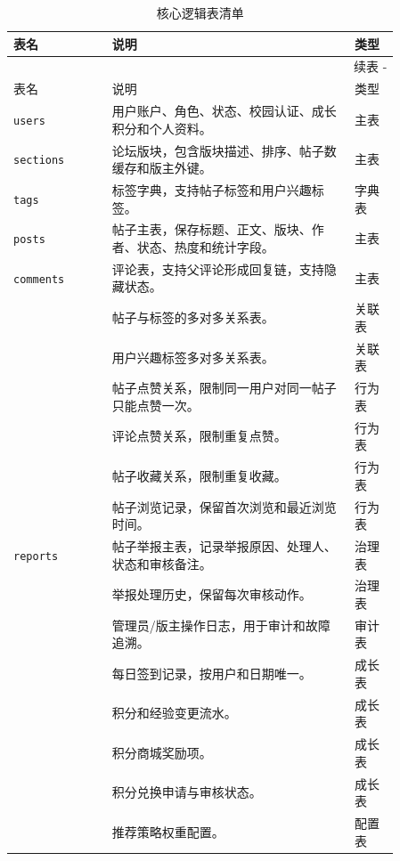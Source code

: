 \documentclass[UTF8,zihao=-4,a4paper]{ctexart}
\renewcommand{\thetable}{\thesection-\arabic{table}}
\begin{document}
\begin{longtable}{L{0.22\linewidth}L{0.54\linewidth}L{0.10\linewidth}}
\caption{核心逻辑表清单}\\
\toprule
表名 & 说明 & 类型 \\
\midrule
\endfirsthead
\multicolumn{3}{r}{续表 \thetable}\\
\toprule
表名 & 说明 & 类型 \\
\midrule
\endhead
\bottomrule
\endfoot
\texttt{users} & 用户账户、角色、状态、校园认证、成长积分和个人资料。 & 主表\\
\texttt{sections} & 论坛版块，包含版块描述、排序、帖子数缓存和版主外键。 & 主表\\
\texttt{tags} & 标签字典，支持帖子标签和用户兴趣标签。 & 字典表\\
\texttt{posts} & 帖子主表，保存标题、正文、版块、作者、状态、热度和统计字段。 & 主表\\
\texttt{comments} & 评论表，支持父评论形成回复链，支持隐藏状态。 & 主表\\
 & 帖子与标签的多对多关系表。 & 关联表\\
 & 用户兴趣标签多对多关系表。 & 关联表\\
 & 帖子点赞关系，限制同一用户对同一帖子只能点赞一次。 & 行为表\\
 & 评论点赞关系，限制重复点赞。 & 行为表\\
 & 帖子收藏关系，限制重复收藏。 & 行为表\\
 & 帖子浏览记录，保留首次浏览和最近浏览时间。 & 行为表\\
\texttt{reports} & 帖子举报主表，记录举报原因、处理人、状态和审核备注。 & 治理表\\
 & 举报处理历史，保留每次审核动作。 & 治理表\\
 & 管理员/版主操作日志，用于审计和故障追溯。 & 审计表\\
 & 每日签到记录，按用户和日期唯一。 & 成长表\\
 & 积分和经验变更流水。 & 成长表\\
 & 积分商城奖励项。 & 成长表\\
 & 积分兑换申请与审核状态。 & 成长表\\
 & 推荐策略权重配置。 & 配置表\\
\end{longtable}
\end{document}
